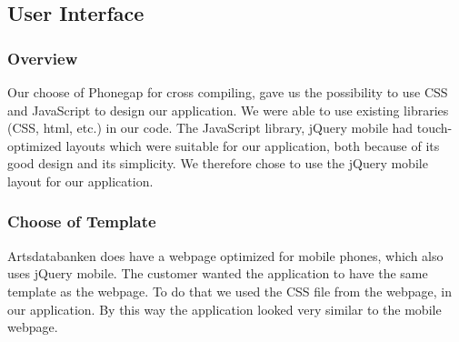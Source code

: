 \subsection{User Interface}
	\subsubsection{Overview}
	Our choose of Phonegap for cross compiling, gave us the possibility to use CSS and JavaScript to design our application. We were able to use existing libraries (CSS, html, etc.) in our code. The JavaScript library, jQuery mobile had touch-optimized layouts which were suitable for our application, both because of its good design and its simplicity. We therefore chose to use the jQuery mobile layout for our application.  

	\subsubsection{Choose of Template}
Artsdatabanken does have a webpage optimized for mobile phones, which also uses jQuery mobile. The customer wanted the application to have the same template as the webpage. To do that we used the CSS file from the webpage, in our application. By this way the application looked very similar to the mobile webpage. 
